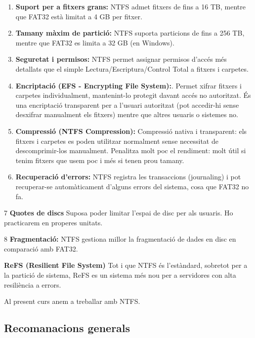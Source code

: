 \documentclass[
  a4paper,
]{article}
\begin{document}
\begin{enumerate}
\def\labelenumi{\arabic{enumi}.}
\item
  \textbf{Suport per a fitxers grans:} NTFS admet fitxers de fins a 16
  TB, mentre que FAT32 està limitat a 4 GB per fitxer.
\item
  \textbf{Tamany màxim de partició:} NTFS suporta particions de fins a
  256 TB, mentre que FAT32 es limita a 32 GB (en Windows).
\item
  \textbf{Seguretat i permisos:} NTFS permet assignar permisos d'accés
  més detallats que el simple Lectura/Escriptura/Control Total a fitxers
  i carpetes.
\item
  \textbf{Encriptació (EFS - Encrypting File System):}. Permet xifrar
  fitxers i carpetes individualment, mantenint-lo protegit davant accés
  no autoritzat. És una encriptació transparent per a l'usuari
  autoritzat (pot accedir-hi sense desxifrar manualment els fitxers)
  mentre que altres usuaris o sistemes no.
\item
  \textbf{Compressió (NTFS Compression):} Compressió nativa i
  transparent: els fitxers i carpetes es poden utilitzar normalment
  sense necessitat de descomprimir-los manualment. Penalitza molt poc el
  rendiment: molt útil si tenim fitxers que usem poc i més si tenen prou
  tamany.
\item
  \textbf{Recuperació d'errors:} NTFS registra les transaccions
  (journaling) i pot recuperar-se automàticament d'alguns errors del
  sistema, cosa que FAT32 no fa.
\end{enumerate}

7 \textbf{Quotes de discs} Suposa poder limitar l'espai de disc per als
usuaris. Ho practicarem en properes unitats.

8 \textbf{Fragmentació:} NTFS gestiona millor la fragmentació de dades
en disc en comparació amb FAT32.

\textbf{ReFS (Resilient File System)} Tot i que NTFS és l'estàndard,
sobretot per a la partició de sistema, ReFS es un sistema més nou per a
servidores con alta resiliència a errors.

Al present curs anem a treballar amb NTFS.

\subsection{Recomanacions generals}\label{recomanacions-generals}
\end{document}
